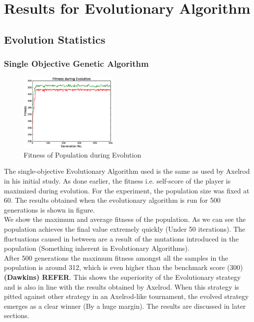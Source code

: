 \documentclass[a4paper]{article}
\begin{document}
	\section{Results for Evolutionary Algorithm}

	\subsection{Evolution Statistics}

	\subsubsection{Single Objective Genetic Algorithm}	

	\begin{figure}
	\centering
	\includegraphics[width=0.43\textwidth]{singFitPlot.eps}
	\caption{\footnotesize{Fitness of Population during Evolution}}
	\end{figure}
	The single-objective Evolutionary Algorithm used is the same as used by Axelrod in his initial study. As done earlier, the fitness i.e. self-score of the player is maximized during evolution. For the experiment, the population size was fixed at 60. The results obtained when the evolutionary algorithm is run for 500 generations is shown in figure.\\
	We show the maximum and average fitness of the population. As we can see the population achieves the final value extremely quickly (Under 50 iterations). The fluctuations caused in between are a result of the mutations introduced in the population (Something inherent in Evolutionary Algorithms).\\
	After 500 generations the maximum fitness amongst all the samples in the population is around 312, which is even higher than the benchmark score (300) \textbf{(Dawkins) \textbf{REFER}}. This shows the superiority of the Evolutionary strategy and is also in line with the results obtained by Axelrod. When this strategy is pitted against other strategy in an Axelrod-like tournament, the evolved strategy emerges as a clear winner (By a huge margin). The results are discussed in later sections.	
\end{document}
